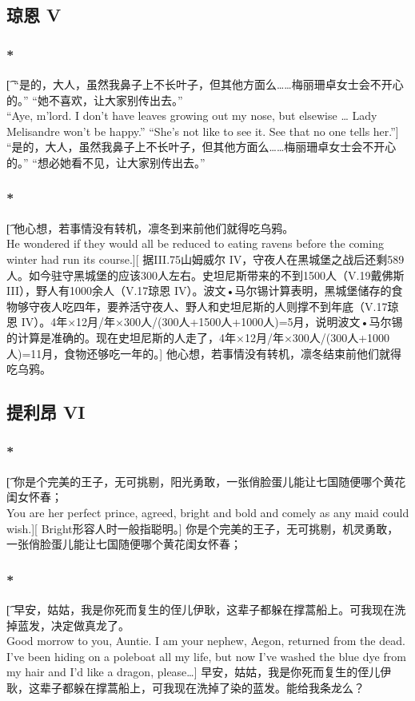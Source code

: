 \documentclass[12pt,a4paper]{article}
\begin{document}
\subsection{琼恩 V}
\subsubsection{\color{red}*}\t[
	“是的，大人，虽然我鼻子上不长叶子，但其他方面么……梅丽珊卓女士会不开心的。” “她不喜欢，让大家别传出去。”\\
	“Aye, m'lord. I don't have leaves growing out my nose, but elsewise … Lady Melisandre won't be happy.” “She's not like to see it. See that no one tells her.”]
	“是的，大人，虽然我鼻子上不长叶子，但其他方面么……梅丽珊卓女士会不开心的。” “想必她看不见，让大家别传出去。”
	
\subsubsection{\color{red}*}\t[
	他心想，若事情没有转机，凛冬到来前他们就得吃乌鸦。\\
	He wondered if they would all be reduced to eating ravens before the coming winter had run its course.][
	据III.75山姆威尔 IV，守夜人在黑城堡之战后还剩589人。如今驻守黑城堡的应该300人左右。史坦尼斯带来的不到1500人（V.19戴佛斯 III），野人有1000余人（V.17琼恩 IV）。波文•马尔锡计算表明，黑城堡储存的食物够守夜人吃四年，要养活守夜人、野人和史坦尼斯的人则撑不到年底（V.17琼恩 IV）。4年×12月/年×300人/(300人+1500人+1000人)=5月，说明波文•马尔锡的计算是准确的。现在史坦尼斯的人走了，4年×12月/年×300人/(300人+1000人)=11月，食物还够吃一年的。]
	他心想，若事情没有转机，凛冬结束前他们就得吃乌鸦。
		
\subsection{提利昂 VI}
\subsubsection{\color{red}*}\t[
	你是个完美的王子，无可挑剔，阳光勇敢，一张俏脸蛋儿能让七国随便哪个黄花闺女怀春；\\
	You are her perfect prince, agreed, bright and bold and comely as any maid could wish.][
	Bright形容人时一般指聪明。]
	你是个完美的王子，无可挑剔，机灵勇敢，一张俏脸蛋儿能让七国随便哪个黄花闺女怀春；
	
\subsubsection{\color{red}*}\t[
	早安，姑姑，我是你死而复生的侄儿伊耿，这辈子都躲在撑蒿船上。可我现在洗掉蓝发，决定做真龙了。\\
	Good morrow to you, Auntie. I am your nephew, Aegon, returned from the dead. I've been hiding on a poleboat all my life, but now I've washed the blue dye from my hair and I'd like a dragon, please\ldots ]
	早安，姑姑，我是你死而复生的侄儿伊耿，这辈子都躲在撑蒿船上，可我现在洗掉了染的蓝发。能给我条龙么？
	
\end{document}

